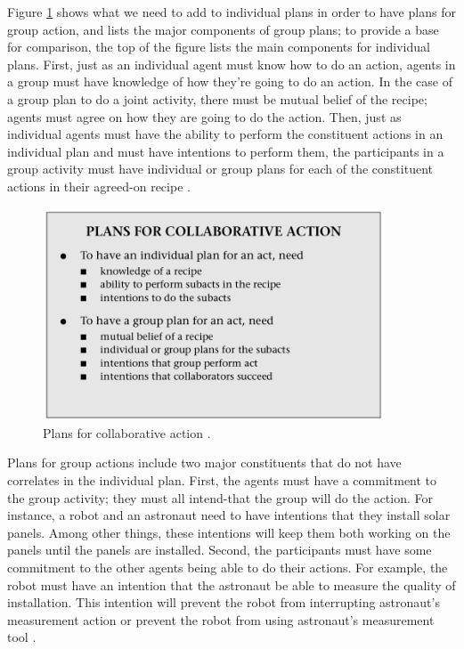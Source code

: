 \documentclass[11pt]{article}
\begin{document}
Figure \ref{fig:plans} shows what we need to add to individual plans in order to
have plans for group action, and lists the major components of group plans; to
provide a base for comparison, the top of the figure lists the main components
for individual plans. First, just as an individual agent must know how to do an
action, agents in a group must have knowledge of how they’re going to do an
action. In the case of a group plan to do a joint activity, there must be mutual
belief of the recipe; agents must agree on how they are going to do the action.
Then, just as individual agents must have the ability to perform the constituent
actions in an individual plan and must have intentions to perform them, the
participants in a group activity must have individual or group plans for each of
the constituent actions in their agreed-on recipe \cite{grosz:plans-discourse}
\cite{grosz:collaborative-systems}.

\begin{figure}[tbh]
  \center
  \includegraphics[width=0.9\textwidth]{figure/plans.png}
  \caption{Plans for collaborative action \cite{grosz:collaborative-systems}.}
  \label{fig:plans}
\end{figure}

Plans for group actions include two major constituents that do not have
correlates in the individual plan. First, the agents must have a commitment to
the group activity; they must all intend-that the group will do the action. For
instance, a robot and an astronaut need to have intentions that they install
solar panels. Among other things, these intentions will keep them both working
on the panels until the panels are installed. Second, the participants must have
some commitment to the other agents being able to do their actions. For example,
the robot must have an intention that the astronaut be able to measure the
quality of installation. This intention will prevent the robot from interrupting
astronaut's measurement action or prevent the robot from using astronaut's
measurement tool \cite{grosz:plans-discourse}
\cite{grosz:collaborative-systems}.
\end{document}
